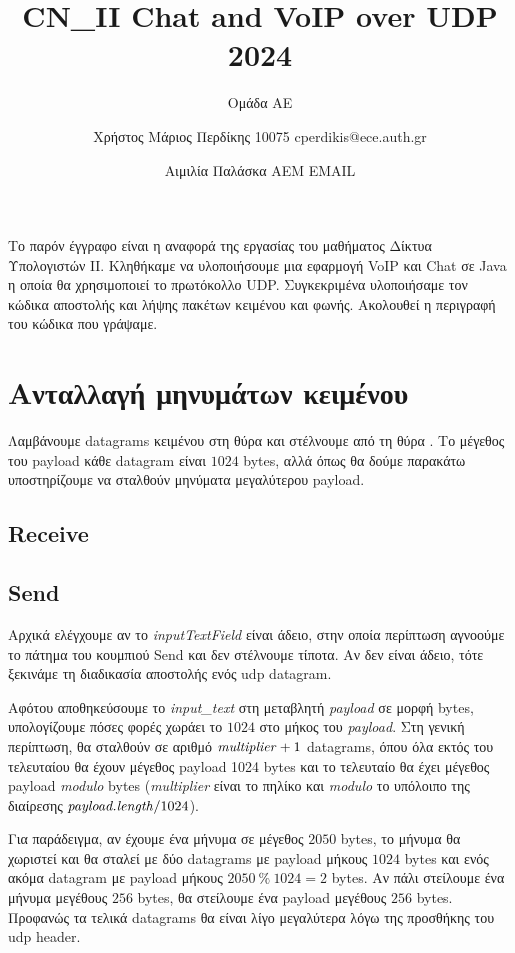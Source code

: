 \documentclass{article}
\title{CN\_II Chat and VoIP over UDP 2024}
\author{Ομάδα ΑΕ%
   \and Χρήστος Μάριος Περδίκης 10075 cperdikis@ece.auth.gr
   \and Αιμιλία Παλάσκα ΑΕΜ EMAIL}
\date{}
\begin{document}
\maketitle

Το παρόν έγγραφο είναι η αναφορά της εργασίας του μαθήματος Δίκτυα Υπολογιστών 
ΙΙ. Κληθήκαμε να υλοποιήσουμε μια εφαρμογή VoIP και Chat σε Java η οποία θα
χρησιμοποιεί το πρωτόκολλο UDP. Συγκεκριμένα υλοποιήσαμε τον κώδικα αποστολής 
και λήψης πακέτων κειμένου και φωνής. Ακολουθεί η περιγραφή του κώδικα που γράψαμε.

\section{Ανταλλαγή μηνυμάτων κειμένου}
Λαμβάνουμε datagrams κειμένου στη θύρα \textdestport{} και στέλνουμε από τη θύρα 
\textdestport. Το μέγεθος του payload κάθε datagram είναι $1024$ bytes, αλλά όπως θα 
δούμε παρακάτω υποστηρίζουμε να σταλθούν μηνύματα μεγαλύτερου payload.

\subsection{Receive}
\subsection{Send}
Αρχικά ελέγχουμε αν το \textit{inputTextField} είναι άδειο, στην οποία 
περίπτωση αγνοούμε το πάτημα του κουμπιού Send και δεν στέλνουμε τίποτα. 
Αν δεν είναι άδειο, τότε ξεκινάμε τη διαδικασία αποστολής ενός udp datagram.

Αφότου αποθηκεύσουμε το \textit{input\_text} στη μεταβλητή 
\textit{payload} σε μορφή bytes, υπολογίζουμε πόσες φορές χωράει το
$1024$ στο μήκος του \textit{payload}. Στη γενική περίπτωση, θα σταλθούν σε αριθμό
$\text{\textit{multiplier}} + 1$ datagrams, όπου όλα εκτός του τελευταίου
θα έχουν μέγεθος payload 1024 bytes και το τελευταίο θα έχει μέγεθος payload \textit{modulo}
bytes (\textit{multiplier} είναι το πηλίκο και \textit{modulo} το υπόλοιπο
της διαίρεσης $\text{\textit{payload.length}} / 1024$).

Για παράδειγμα, αν έχουμε ένα μήνυμα σε μέγεθος $2050$ bytes, το 
μήνυμα θα χωριστεί και θα σταλεί με δύο datagrams με payload μήκους $1024$ bytes
και ενός ακόμα datagram με payload μήκους $2050\ \%\ 1024 = 2$ bytes. Αν πάλι στείλουμε
ένα μήνυμα μεγέθους $256$ bytes, θα στείλουμε ένα payload μεγέθους $256$ bytes. Προφανώς
τα τελικά datagrams θα είναι λίγο μεγαλύτερα λόγω της προσθήκης του udp header.
\end{document}
